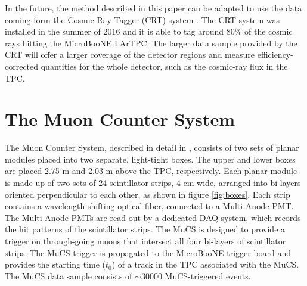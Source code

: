 \documentclass[a4paper,11pt]{article}
\begin{document}

In the future, the method described in this paper can be adapted to use the data coming form the Cosmic Ray Tagger (CRT) system \cite{crt}. The CRT system was installed in the summer of 2016 and it is able to tag around 80\% of the cosmic rays hitting the MicroBooNE LArTPC. The larger data sample provided by the CRT will offer a larger coverage of the detector regions  and measure efficiency-corrected quantities for the whole detector, such as the cosmic-ray flux in the TPC.


\section{The Muon Counter System}\label{sec:proc}
The Muon Counter System, described in detail in \cite{mucs}, consists of two sets of planar modules placed into two separate, light-tight boxes. The upper and lower boxes are placed 2.75 m and 2.03 m above the TPC, respectively. Each planar module is made up of two sets of 24 scintillator strips, 4 cm wide, arranged into bi-layers oriented perpendicular to each other, as shown in figure \ref{fig:boxes}. Each strip contains a wavelength shifting optical fiber, connected to a Multi-Anode PMT. The Multi-Anode PMTs are read out by a dedicated DAQ system, which records the hit patterns of the scintillator strips.
The MuCS is designed to provide a trigger on through-going muons that intersect all four bi-layers of scintillator strips. The MuCS trigger is propagated to the MicroBooNE trigger board and provides the starting time ($t_0$) of a track in the TPC associated with the MuCS. The MuCS data sample consists of $\sim$30000 MuCS-triggered events.
\end{document}
